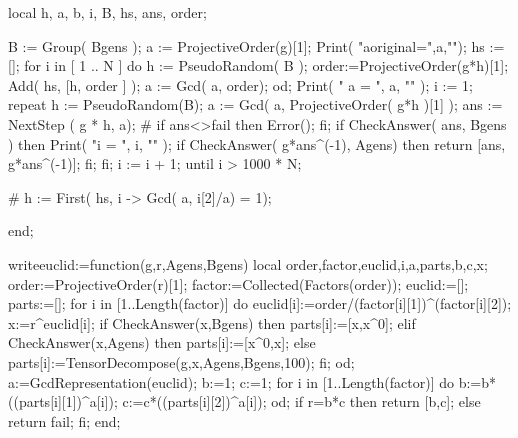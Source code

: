 	local  h, a, b, i, B, hs, ans, order;


	B := Group( Bgens );
	a := ProjectiveOrder(g)[1];
        Print( "aoriginal=",a,"\n");
        hs := [];
	for i in [ 1 .. N ] do
	    h := PseudoRandom( B );
            order:=ProjectiveOrder(g*h)[1];
            Add( hs, [h, order ] );
	    a := Gcd( a, order);
	od;
        Print( " a = ", a, "\n" );
	i := 1;
        repeat
              h := PseudoRandom(B);
	      a := Gcd( a, ProjectiveOrder( g*h )[1] );
	      ans := NextStep ( g * h, a);
#             if ans<>fail then Error(); fi;
	      if CheckAnswer( ans, Bgens ) then
		   Print( "i = ", i, "\n" );
                   if CheckAnswer( g*ans^(-1), Agens) then
                       return [ans, g*ans^(-1)];
                   fi;
	      fi;
	      i := i + 1;
        until  i > 1000 * N;

#		h :=  First( hs, i -> Gcd( a, i[2]/a) = 1);

end;


writeeuclid:=function(g,r,Agens,Bgens)
local order,factor,euclid,i,a,parts,b,c,x;
order:=ProjectiveOrder(r)[1];
factor:=Collected(Factors(order));
euclid:=[];
parts:=[];
     for i in [1..Length(factor)] do
           euclid[i]:=order/(factor[i][1])^(factor[i][2]);
           x:=r^euclid[i];
           if CheckAnswer(x,Bgens) then
                       parts[i]:=[x,x^0];
           elif CheckAnswer(x,Agens) then
                       parts[i]:=[x^0,x];
           else
                       parts[i]:=TensorDecompose(g,x,Agens,Bgens,100);
           fi;
     od;
a:=GcdRepresentation(euclid);
b:=1;
c:=1;
      for i in [1..Length(factor)] do
            b:=b*((parts[i][1])^a[i]);
            c:=c*((parts[i][2])^a[i]);
      od;
      if r=b*c then
            return [b,c];
      else
            return fail;
      fi;
end;

